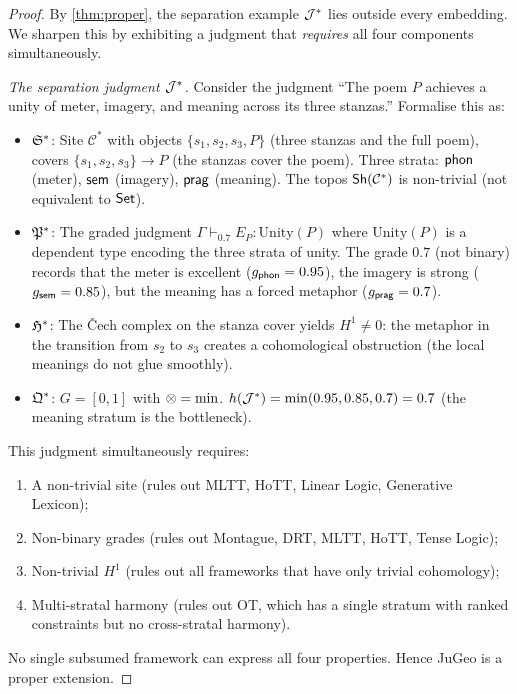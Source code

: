 \begin{proof}
By \cref{thm:proper}, the separation example $\mathcal{J}^*$ lies outside
every embedding.  We sharpen this by exhibiting a judgment that
\emph{requires} all four components simultaneously.

\emph{The separation judgment $\mathcal{J}^*$.}
Consider the judgment ``The poem $P$ achieves a unity of meter,
imagery, and meaning across its three stanzas.''  Formalise this as:

\begin{itemize}[nosep]
\item $\mathfrak{S}^*$: Site $\mathcal{C}^*$ with objects
  $\{s_1, s_2, s_3, P\}$ (three stanzas and the full poem), covers
  $\{s_1, s_2, s_3\} \to P$ (the stanzas cover the poem).
  Three strata: $\mathsf{phon}$ (meter), $\mathsf{sem}$ (imagery), $\mathsf{prag}$
  (meaning).  The topos $\mathsf{Sh}(\mathcal{C}^*)$ is non-trivial (not
  equivalent to $\mathsf{Set}$).

\item $\mathfrak{P}^*$: The graded judgment
  $\Gamma \vdash_{0.7} E_P : \mathrm{Unity}(P)$
  where $\mathrm{Unity}(P)$ is a dependent type encoding the three
  strata of unity.  The grade $0.7$ (not binary) records that the
  meter is excellent ($g_{\mathsf{phon}} = 0.95$), the imagery is strong
  ($g_{\mathsf{sem}} = 0.85$), but the meaning has a forced metaphor
  ($g_{\mathsf{prag}} = 0.7$).

\item $\mathfrak{H}^*$: The \v{C}ech complex on the stanza cover yields
  $H^1 \neq 0$: the metaphor in the transition from $s_2$ to $s_3$
  creates a cohomological obstruction (the local meanings do not glue
  smoothly).

\item $\mathfrak{Q}^*$: $G = [0,1]$ with $\otimes = \min$.
  $h(\mathcal{J}^*) = \min(0.95, 0.85, 0.7) = 0.7$ (the meaning stratum
  is the bottleneck).
\end{itemize}

This judgment simultaneously requires:
\begin{enumerate}[label=(\roman*),nosep]
\item A non-trivial site (rules out MLTT, HoTT, Linear Logic,
  Generative Lexicon);
\item Non-binary grades (rules out Montague, DRT, MLTT, HoTT, Tense
  Logic);
\item Non-trivial $H^1$ (rules out all frameworks that have only
  trivial cohomology);
\item Multi-stratal harmony (rules out OT, which has a single stratum
  with ranked constraints but no cross-stratal harmony).
\end{enumerate}

No single subsumed framework can express all four properties.  Hence
JuGeo is a proper extension.
\end{proof}

